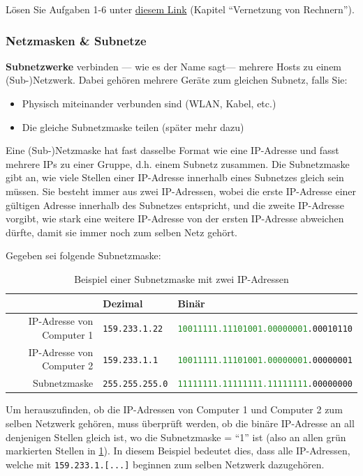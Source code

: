 \begin{mychallenge}
	Lösen Sie Aufgaben 1-6 unter \href{https://inf-schule.de/rechnernetze/filius/vernetzungrechner/erkundung_zweirechner}{diesem Link} (Kapitel ``Vernetzung von Rechnern'').
\end{mychallenge}


\subsubsection{Netzmasken \& Subnetze}
\textbf{Subnetzwerke} verbinden --- wie es der Name sagt--- mehrere Hosts zu einem (Sub-)Netzwerk. Dabei gehören mehrere Geräte zum gleichen Subnetz, falls Sie:
\begin{itemize}
	\item Physisch miteinander verbunden sind (WLAN, Kabel, etc.)
	\item Die gleiche Subnetzmaske teilen (später mehr dazu)
\end{itemize}

Eine (Sub-)Netzmaske hat fast dasselbe Format wie eine IP-Adresse und fasst mehrere IPs zu einer Gruppe, d.h. einem Subnetz zusammen. Die Subnetzmaske gibt an, wie viele Stellen einer IP-Adresse innerhalb eines Subnetzes gleich sein müssen. Sie besteht immer aus zwei IP-Adressen, wobei die erste IP-Adresse einer gültigen Adresse innerhalb des Subnetzes entspricht, und die zweite IP-Adresse vorgibt, wie stark eine weitere IP-Adresse von der ersten IP-Adresse abweichen dürfte, damit sie immer noch zum selben Netz gehört.

\begin{myexample}
Gegeben sei folgende Subnetzmaske:
\begin{table}[H]
	\centering
	\begin{tabular}{r|l|l}
		                                     & Dezimal                & Binär                                                                 \\\midrule\midrule
		\acrshort{IP}-Adresse von Computer 1 & \texttt{159.233.1.22}  & \texttt{\textcolor{ForestGreen}{10011111.11101001.00000001}.00010110} \\\midrule
		\acrshort{IP}-Adresse von Computer 2 & \texttt{159.233.1.1}   & \texttt{\textcolor{ForestGreen}{10011111.11101001.00000001}.00000001} \\\midrule
		Subnetzmaske                         & \texttt{255.255.255.0} & \texttt{\textcolor{ForestGreen}{11111111.11111111.11111111}.00000000}
	\end{tabular}
	\caption{Beispiel einer Subnetzmaske mit zwei IP-Adressen}
	\label{table:ex-subnet}
\end{table}
Um herauszufinden, ob die IP-Adressen von Computer 1 und Computer 2 zum selben Netzwerk gehören, muss überprüft werden, ob die binäre IP-Adresse an all denjenigen Stellen gleich ist, wo die Subnetzmaske = ``1'' ist (also an allen grün markierten Stellen in \cref{table:ex-subnet}). In diesem Beispiel bedeutet dies, dass alle \gls{IP}-Adressen, welche mit \texttt{159.233.1.[...]} beginnen zum selben Netzwerk dazugehören.
\end{myexample}


